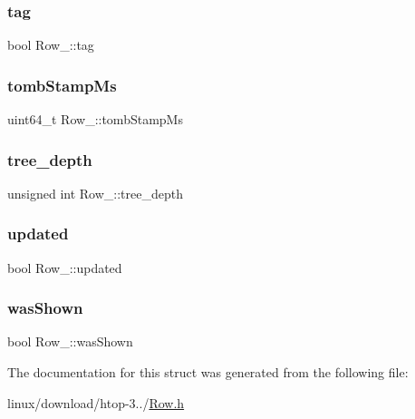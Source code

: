 \mbox{\label{structRow___a2b0ab53782aa678a48fb65b4a838a117}} 
\subsubsection{\texorpdfstring{tag}{tag}}
{\footnotesize\ttfamily bool Row\+\_\+\+::tag}

\mbox{\label{structRow___ac9eaf58061d7d8baa39c3425e09e8ea8}} 
\subsubsection{\texorpdfstring{tomb\+Stamp\+Ms}{tombStampMs}}
{\footnotesize\ttfamily uint64\+\_\+t Row\+\_\+\+::tomb\+Stamp\+Ms}

\mbox{\label{structRow___a826b4abdace776629e258bca0a8e4f59}} 
\subsubsection{\texorpdfstring{tree\+\_\+depth}{tree\_depth}}
{\footnotesize\ttfamily unsigned int Row\+\_\+\+::tree\+\_\+depth}

\mbox{\label{structRow___a06fda62c475be6b301f2e3fc53aaa864}} 
\subsubsection{\texorpdfstring{updated}{updated}}
{\footnotesize\ttfamily bool Row\+\_\+\+::updated}

\mbox{\label{structRow___a56c89fbb1b1a4843cbeb50d86a238d0c}} 
\subsubsection{\texorpdfstring{was\+Shown}{wasShown}}
{\footnotesize\ttfamily bool Row\+\_\+\+::was\+Shown}



The documentation for this struct was generated from the following file\+:\begin{DoxyCompactItemize}
\item 
linux/download/htop-\/3../\hyperlink{Row_8h}{Row.\+h}\end{DoxyCompactItemize}
